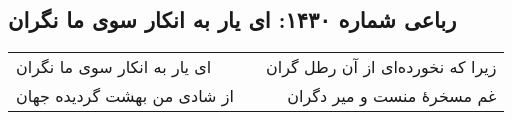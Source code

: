\begin{center}
\section*{رباعی شماره ۱۴۳۰: ای یار به انکار سوی ما نگران}
\label{sec:1430}
\begin{longtable}{l p{0.5cm} r}
ای یار به انکار سوی ما نگران
&&
زیرا که نخورده‌ای از آن رطل گران
\\
از شادی من بهشت گردیده جهان
&&
غم مسخرهٔ منست و میر دگران
\\
\end{longtable}
\end{center}
